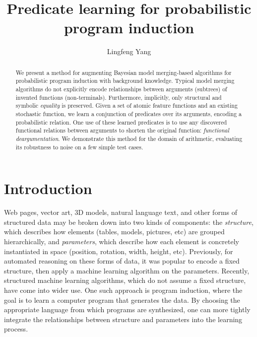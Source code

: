\documentclass{acmsiggraph}
\begin{document}
\title{Predicate learning for probabilistic program induction}

\author{Lingfeng Yang}
\maketitle

\begin{abstract}
We present a method for augmenting Bayesian model merging-based
algorithms for probabilistic program induction
with background knowledge.
Typical model merging algorithms
do not explicitly encode relationships
between arguments (subtrees) of invented functions (non-terminals).
Furthermore, implicitly, only structural and symbolic \emph{equality} is preserved.
Given a set of atomic feature functions and an existing stochastic function,
we learn a conjunction of predicates over its arguments,
encoding a probabilistic relation.
One use of these learned predicates
is to use any discovered functional relations
between arguments to shorten the original function:
\emph{functional deargumentation}.
We demonstrate this method
for the domain of arithmetic,
evaluating its robustness to noise
on a few simple test cases.
\end{abstract}

\section{Introduction}


Web pages, vector art, 3D models, natural language text, and other forms of structured data
may be broken down into two kinds of components:
the \emph{structure}, which describes how elements (tables, models, pictures, etc) are grouped hierarchically,
and \emph{parameters}, which describe how each element is concretely instantiated in space
(position, rotation, width, height, etc).
Previously, for automated reasoning on these forms of data,
it was popular to encode a fixed structure,
then apply a machine learning algorithm on the parameters.
Recently, structured machine learning algorithms,
which do not assume a fixed structure,
have come into wider use.
One such approach is program induction,
where the goal is to learn a computer program that generates the data.
By choosing the appropriate language from which programs are synthesized,
one can more tightly integrate the relationships between structure and parameters
into the learning process.
\end{document}
